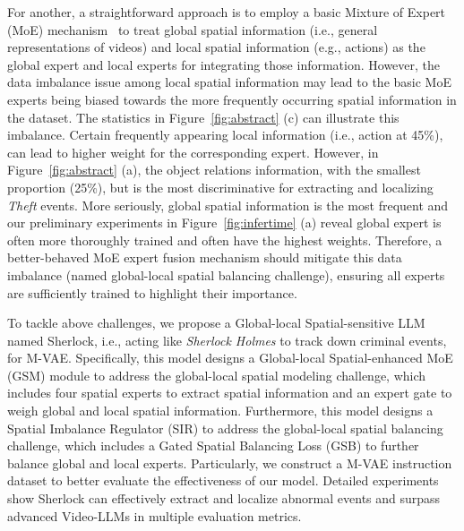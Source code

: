 For another, a straightforward approach is to employ a basic Mixture of Expert (MoE) mechanism~\cite{onellm,onellm2,nestedmoe} to treat global spatial information (i.e., general representations of videos) and local spatial information (e.g., actions) as the global expert and local experts for integrating those information. However, the data imbalance issue among local spatial information may lead to the basic MoE experts being biased towards the more frequently occurring spatial information in the dataset. The statistics in Figure~\ref{fig:abstract} (c) can illustrate this imbalance. Certain frequently appearing local information (i.e., action at 45\%), can lead to higher weight for the corresponding expert. However, in Figure~\ref{fig:abstract} (a), the object relations information, with the smallest proportion (25\%), but is the most discriminative for extracting and localizing \emph{Theft} events. More seriously, global spatial information is the most frequent and our preliminary experiments in Figure~\ref{fig:infertime} (a) reveal global expert is often more thoroughly trained and often have the highest weights. Therefore, a better-behaved MoE expert fusion mechanism should mitigate this data imbalance (named global-local spatial balancing challenge), ensuring all experts are sufficiently trained to highlight their importance.

To tackle above challenges, we propose a Global-local Spatial-sensitive LLM named Sherlock, i.e., acting like \emph{Sherlock Holmes} to track down criminal events, for M-VAE. Specifically, this model designs a Global-local Spatial-enhanced MoE (GSM) module to address the global-local spatial modeling challenge, which includes four spatial experts to extract spatial information and an expert gate to weigh global and local spatial information. Furthermore, this model designs a Spatial Imbalance Regulator (SIR) to address the global-local spatial balancing challenge, which includes a Gated Spatial Balancing Loss (GSB) to further balance global and local experts. Particularly, we construct a M-VAE instruction dataset to better evaluate the effectiveness of our model. Detailed experiments show Sherlock can effectively extract and localize abnormal events and surpass advanced Video-LLMs in multiple evaluation metrics. 





